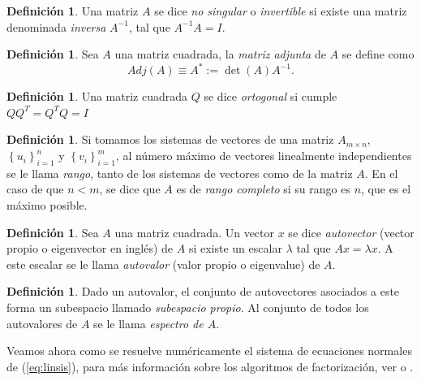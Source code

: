 \documentclass[11pt,a4paper]{book}
\theoremstyle{definition}
\newtheorem{definition}[theorem]{Definición}
\theoremstyle{remark}
\newcommand{\sucesion}[1]{\left\{#1\right\}}
\begin{document}
\begin{definition}
	Una matriz $A$ se dice \textit{no singular} o \textit{invertible} si existe una matriz denominada \textit{inversa} $A^{-1}$, tal que
	$A^{-1}A = I$.
\end{definition}

\begin{definition}
	Sea $A$ una matriz cuadrada, la \textit{matriz adjunta} de $A$ se define como
	\begin{equation}
		Adj(A) \equiv A^* := \det(A)A^{-1}.
	\end{equation}
\end{definition}

\begin{definition}
	Una matriz cuadrada $Q$ se dice \textit{ortogonal} si cumple $QQ^T=Q^TQ=I$
\end{definition}

\begin{definition}
	Si tomamos los sistemas de vectores de una matriz $A_{m \times n}$, $\sucesion{u_i}_{i=1}^n$ y $\sucesion{v_i}_{i=1}^m$, al número máximo de vectores linealmente independientes se le llama \textit{rango}, tanto de los sistemas de vectores como de la matriz $A$. En el caso de que $n<m$, se dice que $A$ es de \textit{rango completo} si su rango es $n$, que es el máximo posible.
\end{definition}

\begin{definition}
	Sea $A$ una matriz cuadrada. Un vector $x$ se dice \textit{autovector} (vector propio o
	eigenvector en inglés) de $A$ si existe un
	escalar $\lambda$ tal que $Ax=\lambda x$. A este escalar se le llama \textit{autovalor} 
	(valor propio o eigenvalue) de $A$.
\end{definition}	
\begin{definition}
	Dado un autovalor, el conjunto de autovectores asociados
	a este forma un subespacio llamado \textit{subespacio propio}.
	Al conjunto de todos los autovalores de $A$ se le llama \textit{espectro de $A$}.
\end{definition}

Veamos ahora como se resuelve numéricamente el sistema de ecuaciones normales de (\ref{eq:linsis}), para más información sobre los algoritmos de factorización, ver \cite{Trefethen1997-ek} o \cite{Golub2013-li}.
\end{document}
